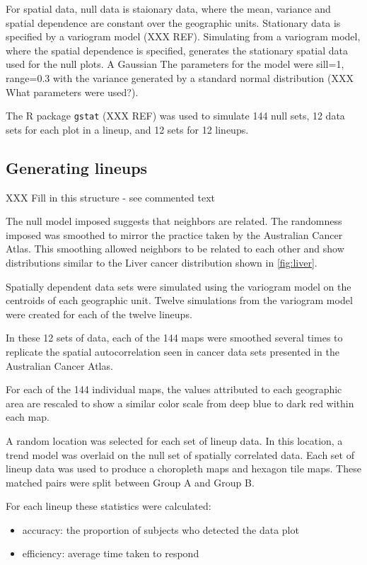 \documentclass[conference,final,]{IEEEtran}
\providecommand{\tightlist}{%
  \setlength{\itemsep}{0pt}\setlength{\parskip}{0pt}}
\begin{document}
For spatial data, null data is staionary data, where the mean, variance and spatial dependence are constant over the geographic units. Stationary data is specified by a variogram model (XXX REF). Simulating from a variogram model, where the spatial dependence is specified, generates the stationary spatial data used for the null plots. A Gaussian The parameters for the model were sill=1, range=0.3 with the variance generated by a standard normal distribution (XXX What parameters were used?).

The R package \texttt{gstat} (XXX REF) was used to simulate 144 null sets, 12 data sets for each plot in a lineup, and 12 sets for 12 lineups.

\hypertarget{generating-lineups}{%
\subsection{Generating lineups}\label{generating-lineups}}

XXX Fill in this structure - see commented text

The null model imposed suggests that neighbors are related. The randomness imposed was smoothed to mirror the practice taken by the Australian Cancer Atlas. This smoothing allowed neighbors to be related to each other and show distributions similar to the Liver cancer distribution shown in \ref{fig:liver}.

Spatially dependent data sets were simulated using the variogram model on the centroids of each geographic unit. Twelve simulations from the variogram model were created for each of the twelve lineups.

In these 12 sets of data, each of the 144 maps were smoothed several times to replicate the spatial autocorrelation seen in cancer data sets presented in the Australian Cancer Atlas.

For each of the 144 individual maps, the values attributed to each geographic area are rescaled to show a similar color scale from deep blue to dark red within each map.

A random location was selected for each set of lineup data.
In this location, a trend model was overlaid on the null set of spatially correlated data.
Each set of lineup data was used to produce a choropleth maps and hexagon tile maps. These matched pairs were split between Group A and Group B.

For each lineup these statistics were calculated:

\begin{itemize}
\tightlist
\item
  accuracy: the proportion of subjects who detected the data plot
\item
  efficiency: average time taken to respond
\end{itemize}
\end{document}
